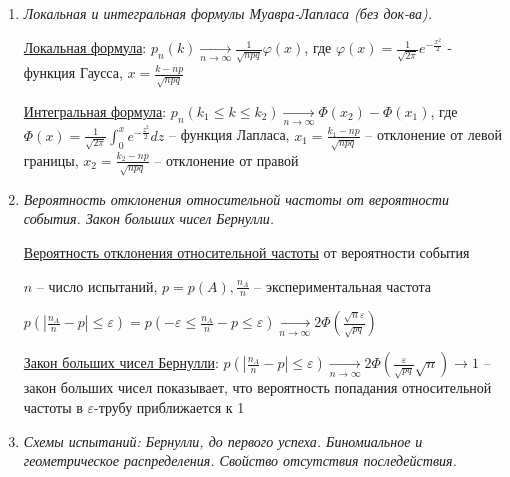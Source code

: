 \begin{enumerate}
\begin{enumerate}
        \item $np + p$ -- нецелое, тогда $k = \lfloor np + p \rfloor$

        \item $np + p$ -- целое, тогда $np + p - 1$ -- целое, тогда $k \in \{np + p - 1, np + p\}$
    \end{enumerate}

    \item \textit{Локальная и интегральная формулы Муавра-Лапласа (без док-ва).}

    \hyperlink{localformulademoivrelaplace}{Локальная формула}: $p_n(k) \underset{n \to \infty}{\longrightarrow} \frac{1}{\sqrt{npq}} \varphi(x)$, где $\varphi(x) = \frac{1}{\sqrt{2\pi}} e^{-\frac{x^2}{2}}$ - функция Гаусса, 
    $x = \frac{k - np}{\sqrt{npq}}$

    \hyperlink{integralformulademoivrelaplace}{Интегральная формула}: $p_n(k_1 \leq k \leq k_2) \underset{n \to \infty}{\longrightarrow} \Phi(x_2) - \Phi(x_1)$, где $\Phi(x) = \frac{1}{\sqrt{2\pi}} \int_0^x e^{-\frac{z^2}{2}} dz$ -- функция Лапласа,
    $x_1 = \frac{k_1 - np}{\sqrt{npq}}$ -- отклонение от левой границы, $x_2 = \frac{k_2 - np}{\sqrt{npq}}$ -- отклонение от правой

    \item \textit{Вероятность отклонения относительной частоты от вероятности события. Закон больших чисел Бернулли.}

    \hyperlink{probabilityofdeviation}{Вероятность отклонения относительной частоты} от вероятности события

    $n$ -- число испытаний, $p = p(A), \frac{n_A}{n}$ -- экспериментальная частота

    $p\left(|\frac{n_A}{n} - p| \leq \varepsilon\right) = p\left(-\varepsilon \leq \frac{n_A}{n} - p \leq \varepsilon\right) \underset{n \to \infty}{\longrightarrow} 2\Phi\left(\frac{\sqrt{n}\varepsilon}{\sqrt{pq}}\right)$

    \hyperlink{lawofbignumbersbernoulli}{Закон больших чисел Бернулли}: $p\left(|\frac{n_A}{n} - p| \leq \varepsilon\right) \underset{n \to \infty}{\longrightarrow} 2 \Phi\left(\frac{\varepsilon}{\sqrt{pq}}\sqrt{n}\right) \to 1$ -- 
    закон больших чисел показывает, что вероятность попадания относительной частоты в $\varepsilon$-трубу приближается к 1

    \item \textit{Схемы испытаний: Бернулли, до первого успеха. Биномиальное и геометрическое распределения. Свойство отсутствия последействия.}


\end{enumerate}
